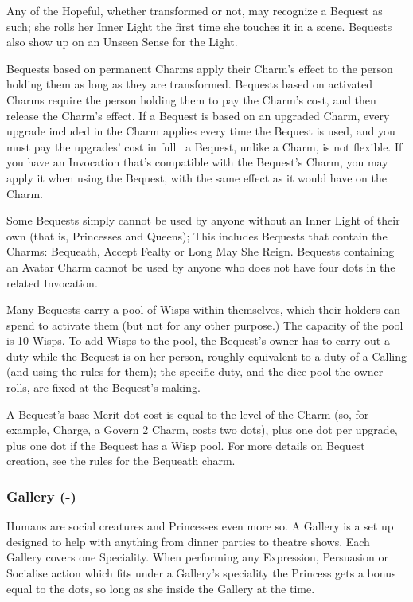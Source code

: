 Any of the Hopeful, whether transformed or not, may recognize a Bequest as such; she rolls her Inner Light the first time she touches it in a scene. Bequests also show up on an Unseen Sense for the Light.

Bequests based on permanent Charms apply their Charm's effect to the person holding them as long as they are transformed. Bequests based on activated Charms require the person holding them to pay the Charm's cost, and then release the Charm's effect. If a Bequest is based on an upgraded Charm, every upgrade included in the Charm applies every time the Bequest is used, and you must pay the upgrades' cost in full \textendash\, a Bequest, unlike a Charm, is not flexible. If you have an Invocation that's compatible with the Bequest's Charm, you may apply it when using the Bequest, with the same effect as it would have on the Charm.

Some Bequests simply cannot be used by anyone without an Inner Light of their own (that is, Princesses and Queens); This includes Bequests that contain the Charms: Bequeath, Accept Fealty or Long May She Reign. Bequests containing an Avatar Charm cannot be used by anyone who does not have four dots in the related Invocation.

Many Bequests carry a pool of Wisps within themselves, which their holders can spend to activate them (but not for any other purpose.) The capacity of the pool is 10 Wisps. To add Wisps to the pool, the Bequest’s owner has to carry out a duty while the Bequest is on her person, roughly equivalent to a duty of a Calling (and using the rules for them); the specific duty, and the dice pool the owner rolls, are fixed at the Bequest’s making.

A Bequest's base Merit dot cost is equal to the level of the Charm (so, for example, Charge, a Govern 2 Charm, costs two dots), plus one dot per upgrade, plus one dot if the Bequest has a Wisp pool. For more details on Bequest creation, see the rules for the Bequeath charm.

\subsubsection*{Gallery (\textbullet\nobreak\hspace{.16667em}-\nobreak\hspace{.16667em}\textbullet\textbullet\textbullet)}

Humans are social creatures and Princesses even more so. A Gallery is a set up designed to help with anything from dinner parties to theatre shows. Each Gallery covers one Speciality. When performing any Expression, Persuasion or Socialise action which fits under a Gallery's speciality the Princess gets a bonus equal to the dots, so long as she inside the Gallery at the time. 

